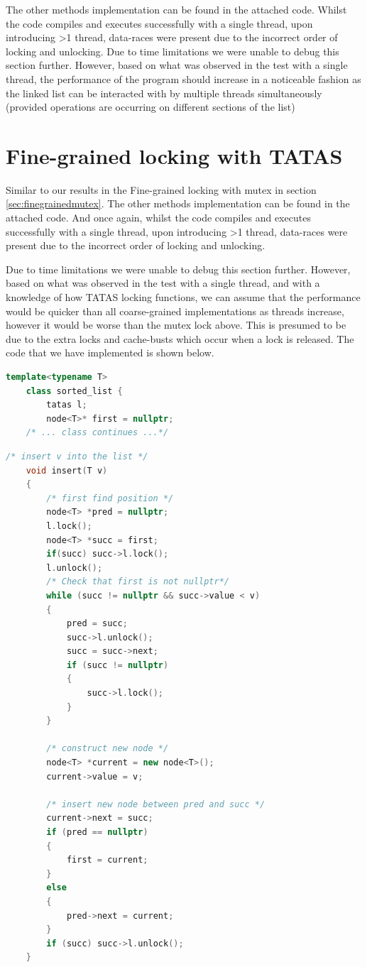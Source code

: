 The other methods implementation can be found in the attached code.
Whilst the code compiles and executes successfully with a single thread,
upon introducing >1 thread, data-races were present due to the incorrect order of locking 
and unlocking. 
Due to time limitations we were unable to debug this section further. 
However, based on what was observed in the test with a single thread, the performance of the 
program should increase in a noticeable fashion as the linked list can be interacted with by multiple threads 
simultaneously (provided operations are occurring on different sections of the list)

\section{Fine-grained locking with TATAS}\label{sec:finegrainedtatas}
	
Similar to our results in the Fine-grained locking with mutex in section \ref{sec:finegrainedmutex}.
The other methods implementation can be found in the attached code.
And once again, whilst the code compiles and executes successfully with a single thread,
upon introducing >1 thread, data-races were present due to the incorrect order of locking 
and unlocking. 

Due to time limitations we were unable to debug this section further. 
However, based on what was observed in the test with a single thread, and with a knowledge of how TATAS locking functions,
we can assume that the performance would be quicker than all coarse-grained implementations as threads increase, however it would be worse than the mutex lock above.
This is presumed to be due to the extra locks and cache-busts which occur when a lock is released.
The code that we have implemented is shown below.

\begin{lstlisting}[language=C++, caption=Sorted list tatas lock]
	template<typename T>
	class sorted_list {
		tatas l;
		node<T>* first = nullptr;
	/* ... class continues ...*/
\end{lstlisting}

\begin{lstlisting}[language=C++, caption=Fine grained attemot with tatas locks.]
	/* insert v into the list */
	void insert(T v)
	{
		/* first find position */
		node<T> *pred = nullptr;
		l.lock();
		node<T> *succ = first;
		if(succ) succ->l.lock();
		l.unlock();
		/* Check that first is not nullptr*/
		while (succ != nullptr && succ->value < v)
		{
			pred = succ;
			succ->l.unlock();
			succ = succ->next;
			if (succ != nullptr)
			{
				succ->l.lock();
			}
		}
	
		/* construct new node */
		node<T> *current = new node<T>();
		current->value = v;
	
		/* insert new node between pred and succ */
		current->next = succ;
		if (pred == nullptr)
		{
			first = current;
		}
		else
		{
			pred->next = current;
		}
		if (succ) succ->l.unlock();
	}
\end{lstlisting}

